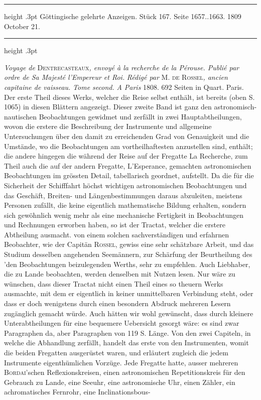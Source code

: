 \par{}\bigskip
\hypertarget{native-519-lower}{}\label{native-519-lower}
\begin{center}
\parbox{.9\linewidth}{%
\centering\small
\hrule height .3pt\relax\vspace{2.5pt}
Göttingische gelehrte Anzeigen. Stück 167. Seite 1657..1663. 1809 October 21.\par
\vspace{2.5pt}\hrule height .3pt\relax
}
\end{center}
\par\nobreak\medskip

\emph{Voyage de} \textsc{Dentrecasteaux}\emph{, envoyé à la recherche de la Pérouse. Publié par ordre de Sa Majesté l'Empereur et Roi.} \emph{Rédigé par} M. \textsc{de Rossel}\emph{, ancien capitaine de vaisseau.} \emph{Tome second.} \emph{A Paris} 1808. 692 Seiten in Quart. Paris. Der erste Theil dieses Werks, welcher die Reise selbst enthält, ist bereits (oben S. 1065) in diesen Blättern angezeigt. Dieser zweite Band ist ganz den astronomisch-nautischen Beobachtungen gewidmet und zerfällt in zwei Hauptabtheilungen, wovon die erstere die Beschreibung der Instrumente und allgemeine Untersuchungen über den damit zu erreichenden Grad von Genauigkeit und die Umstände, wo die Beobachtungen am vortheilhaftesten anzustellen sind, enthält; die andere hingegen die während der Reise auf der Fregatte La Recherche, zum Theil auch die auf der andern Fregatte, L'Esperance, gemachten astronomischen Beobachtungen im grössten Detail, tabellarisch geordnet, aufstellt. Da die für die Sicherheit der Schifffahrt höchst wichtigen astronomischen Beobachtungen und das Geschäft, Breiten- und Längenbestimmungen daraus abzuleiten, meistens Personen zufällt, die keine eigentlich mathematische Bildung erhalten, sondern sich gewöhnlich wenig mehr als eine mechanische Fertigkeit in Beobachtungen und Rechnungen erworben haben, so ist der Tractat, welcher die erstere Abtheilung ausmacht. von einem solchen sachverständigen und erfahrnen Beobachter, wie der Capitän \textsc{Rossel}, gewiss eine sehr schätzbare Arbeit, und das Studium desselben angehenden Seemännern, zur Schärfung der Beurtheilung des 'den Beobachtungen beizulegenden Werths, sehr zu empfehlen. Auch Liebhaber, die zu Lande beobachten, werden denselben mit Nutzen lesen. Nur wäre zu wünschen, dass dieser Tractat nicht einen Theil eines so theuern Werks ausmachte, mit dem er eigentlich in keiner unmittelbaren Verbindung steht, oder dass er doch wenigstens durch einen besondern Abdruck mehreren Lesern zugänglich gemacht würde. Auch hätten wir wohl gewünscht, dass durch kleinere Unterabtheilungen für eine bequemere Uebersicht gesorgt wäre: es sind zwar Paragraphen da, aber Paragraphen von 119 S. Länge. Von den zwei Capiteln, in welche die Abhandlung zerfällt, handelt das erste von den Instrumenten, womit die beiden Fregatten ausgerüstet waren, und erläutert zugleich die jedem Instrumente eigenthümlichen Vorzüge. Jede Fregatte hatte, ausser mehreren \textsc{Bordai}'schen Reflexionskreisen, einen astronomischen Repetitionskreis für den Gebrauch zu Lande, eine Seeuhr, eine astronomische Uhr, einen Zähler, ein achromatisches Fernrohr, eine Inclinationsbous-\par
